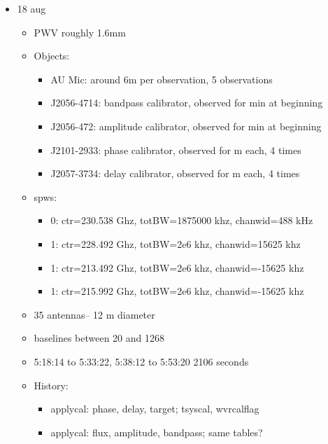 \documentclass[a4paper]{tufte-handout}
\begin{document}
\begin{itemize}
	\item 18 aug
	      \begin{itemize}
	      	\item PWV roughly 1.6mm
	      	\item Objects:
	      	      \begin{itemize}
	      	      	\item AU Mic: around 6m per observation, 5 observations
	      	      	\item J2056-4714: bandpass calibrator, observed for  min at beginning
	      	      	\item J2056-472: amplitude calibrator, observed for  min at beginning
	      	      	\item J2101-2933: phase calibrator, observed for  m each, 4 times
	      	      	\item J2057-3734: delay calibrator, observed for  m each, 4 times
	      	      \end{itemize}
	      	\item spws:
	      	      \begin{itemize}
	      	      	\item 0: ctr=230.538 Ghz, totBW=1875000 khz, chanwid=488 kHz
	      	      	\item 1: ctr=228.492 Ghz, totBW=2e6 khz, chanwid=15625 khz
	      	      	\item 1: ctr=213.492 Ghz, totBW=2e6 khz, chanwid=-15625 khz
	      	      	\item 1: ctr=215.992 Ghz, totBW=2e6 khz, chanwid=-15625 khz
	      	      \end{itemize}
	      	\item 35 antennas-- 12 m diameter
	      	\item baselines between 20 and 1268
	      	\item 5:18:14 to 5:33:22, 5:38:12 to 5:53:20 2106 seconds
          \item History:
          \begin{itemize}
            \item applycal: phase, delay, target; tsyscal, wvrcalflag
            \item applycal: flux, amplitude, bandpass; same tables?
          \end{itemize}
	      \end{itemize}


\end{itemize}
\end{document}
